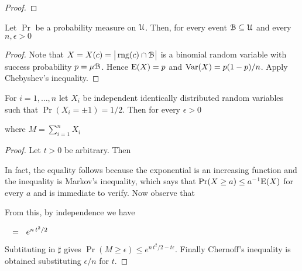 \documentclass[sputnik.tex]{subfiles}
\begin{document}
\begin{proof}


\end{proof}

\begin{void_thm}\label{wlln}
Let $\Pr$ be a probability measure on $\EuScript U$.
Then, for every event $\EuScript B\subseteq\EuScript U$ and every $n,\epsilon>0$

\end{void_thm}


\begin{proof}
Note that $X=X(c)=\big|\mathop{\rm rng}(c)\cap\EuScript B\big|$ is a binomial random variable with success probability $p=\mu\EuScript B$. 
Hence ${\rm E}(X)=p$ and  ${\rm Var}(X)=p(1-p)/n$.
Apply Chebyshev's inequality.
\end{proof}




\begin{lemma}\label{Chernoff}
For $i=1,\dots,n$ let $X_i$ be independent identically distributed random variables such that\/ $\Pr(X_i=\pm1)=1/2$.
Then for every $\epsilon>0$

\hfill where $\displaystyle M=\sum^n_{i=1}X_i$
\end{lemma}
\begin{proof}
Let $t>0$ be arbitrary.
Then



In fact, the equality follows because the exponential is an increasing function and the inequality is Markov's inequality, which says that $\Pr(X\ge a)\le a^{-1}{\rm E}(X)$ for every $a$ and is immediate to verify.
Now observe that






From this, by independence we have 

$\medrel{=}e^{n\,t^2/2}$


Subtituting in $\sharp$ gives $\Pr(M\ge\epsilon)\le e^{n\,t^2/2-t\epsilon}$.
Finally Chernoff's inequality is obtained substituting $\epsilon/n$ for $t$.
\end{proof}
\end{document}
